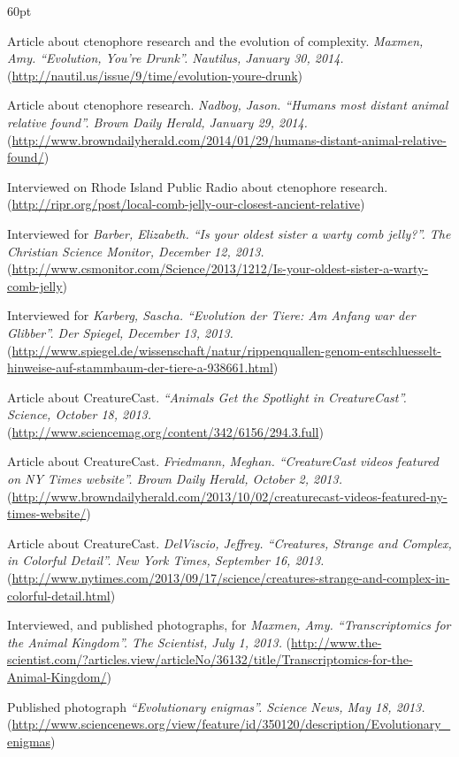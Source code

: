 \begin{entry}{60pt}
\item [\rm 2014] Article about ctenophore research and the evolution of complexity.  \emph{Maxmen, Amy. ``Evolution, You're Drunk''. Nautilus, January 30, 2014.}  (\url{http://nautil.us/issue/9/time/evolution-youre-drunk})
\item [\rm 2014] Article about ctenophore research. \emph{Nadboy, Jason. ``Humans most distant animal relative found''. Brown Daily Herald, January 29, 2014.} (\url{http://www.browndailyherald.com/2014/01/29/humans-distant-animal-relative-found/})
\item [\rm 2013] Interviewed on Rhode Island Public Radio about ctenophore research. (\url{http://ripr.org/post/local-comb-jelly-our-closest-ancient-relative})
\item [\rm 2013] Interviewed for \emph{Barber, Elizabeth. ``Is your oldest sister a warty comb jelly?''. The Christian Science Monitor, December 12, 2013.}  (\url{http://www.csmonitor.com/Science/2013/1212/Is-your-oldest-sister-a-warty-comb-jelly})
\item [\rm 2013] Interviewed for \emph{Karberg, Sascha. ``Evolution der Tiere: Am Anfang war der Glibber''. Der Spiegel, December 13, 2013.}  (\url{http://www.spiegel.de/wissenschaft/natur/rippenquallen-genom-entschluesselt-hinweise-auf-stammbaum-der-tiere-a-938661.html})
\item [\rm 2013] Article about CreatureCast.  \emph{``Animals Get the Spotlight in CreatureCast''. Science, October 18, 2013.} (\url{http://www.sciencemag.org/content/342/6156/294.3.full})
\item [\rm 2013] Article about CreatureCast. \emph{Friedmann, Meghan. ``CreatureCast videos featured on NY Times website''. Brown Daily Herald, October 2, 2013.} (\url{http://www.browndailyherald.com/2013/10/02/creaturecast-videos-featured-ny-times-website/})
\item [\rm 2013] Article about CreatureCast. \emph{DelViscio, Jeffrey. ``Creatures, Strange and Complex, in Colorful Detail''. New York Times, September 16, 2013.} (\url{http://www.nytimes.com/2013/09/17/science/creatures-strange-and-complex-in-colorful-detail.html})
\item [\rm 2013] Interviewed, and published photographs, for \emph{Maxmen, Amy. ``Transcriptomics for the Animal Kingdom''. The Scientist, July 1, 2013.}  (\url{http://www.the-scientist.com/?articles.view/articleNo/36132/title/Transcriptomics-for-the-Animal-Kingdom/})
\item [\rm 2013] Published photograph \emph{``Evolutionary enigmas''. Science News, May 18, 2013.} (\url{http://www.sciencenews.org/view/feature/id/350120/description/Evolutionary_enigmas})

\end{entry}
